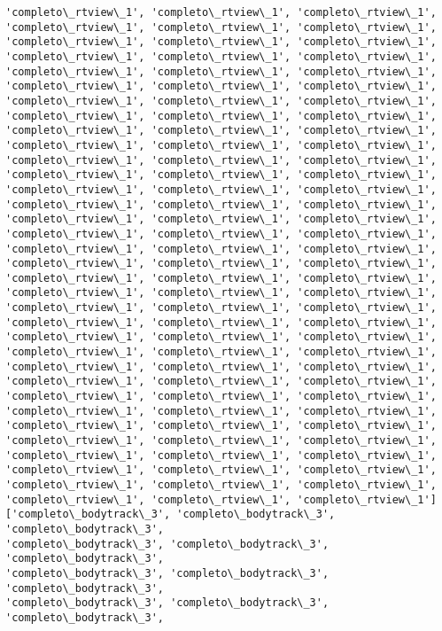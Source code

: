 \documentclass[11pt]{article}
\begin{document}
\begin{Verbatim}[commandchars=\\\{\}]
'completo\_rtview\_1', 'completo\_rtview\_1', 'completo\_rtview\_1',
'completo\_rtview\_1', 'completo\_rtview\_1', 'completo\_rtview\_1',
'completo\_rtview\_1', 'completo\_rtview\_1', 'completo\_rtview\_1',
'completo\_rtview\_1', 'completo\_rtview\_1', 'completo\_rtview\_1',
'completo\_rtview\_1', 'completo\_rtview\_1', 'completo\_rtview\_1',
'completo\_rtview\_1', 'completo\_rtview\_1', 'completo\_rtview\_1',
'completo\_rtview\_1', 'completo\_rtview\_1', 'completo\_rtview\_1',
'completo\_rtview\_1', 'completo\_rtview\_1', 'completo\_rtview\_1',
'completo\_rtview\_1', 'completo\_rtview\_1', 'completo\_rtview\_1',
'completo\_rtview\_1', 'completo\_rtview\_1', 'completo\_rtview\_1',
'completo\_rtview\_1', 'completo\_rtview\_1', 'completo\_rtview\_1',
'completo\_rtview\_1', 'completo\_rtview\_1', 'completo\_rtview\_1',
'completo\_rtview\_1', 'completo\_rtview\_1', 'completo\_rtview\_1',
'completo\_rtview\_1', 'completo\_rtview\_1', 'completo\_rtview\_1',
'completo\_rtview\_1', 'completo\_rtview\_1', 'completo\_rtview\_1',
'completo\_rtview\_1', 'completo\_rtview\_1', 'completo\_rtview\_1',
'completo\_rtview\_1', 'completo\_rtview\_1', 'completo\_rtview\_1',
'completo\_rtview\_1', 'completo\_rtview\_1', 'completo\_rtview\_1',
'completo\_rtview\_1', 'completo\_rtview\_1', 'completo\_rtview\_1',
'completo\_rtview\_1', 'completo\_rtview\_1', 'completo\_rtview\_1',
'completo\_rtview\_1', 'completo\_rtview\_1', 'completo\_rtview\_1',
'completo\_rtview\_1', 'completo\_rtview\_1', 'completo\_rtview\_1',
'completo\_rtview\_1', 'completo\_rtview\_1', 'completo\_rtview\_1',
'completo\_rtview\_1', 'completo\_rtview\_1', 'completo\_rtview\_1',
'completo\_rtview\_1', 'completo\_rtview\_1', 'completo\_rtview\_1',
'completo\_rtview\_1', 'completo\_rtview\_1', 'completo\_rtview\_1',
'completo\_rtview\_1', 'completo\_rtview\_1', 'completo\_rtview\_1',
'completo\_rtview\_1', 'completo\_rtview\_1', 'completo\_rtview\_1',
'completo\_rtview\_1', 'completo\_rtview\_1', 'completo\_rtview\_1',
'completo\_rtview\_1', 'completo\_rtview\_1', 'completo\_rtview\_1',
'completo\_rtview\_1', 'completo\_rtview\_1', 'completo\_rtview\_1',
'completo\_rtview\_1', 'completo\_rtview\_1', 'completo\_rtview\_1',
'completo\_rtview\_1', 'completo\_rtview\_1', 'completo\_rtview\_1',
'completo\_rtview\_1', 'completo\_rtview\_1', 'completo\_rtview\_1']
['completo\_bodytrack\_3', 'completo\_bodytrack\_3', 'completo\_bodytrack\_3',
'completo\_bodytrack\_3', 'completo\_bodytrack\_3', 'completo\_bodytrack\_3',
'completo\_bodytrack\_3', 'completo\_bodytrack\_3', 'completo\_bodytrack\_3',
'completo\_bodytrack\_3', 'completo\_bodytrack\_3', 'completo\_bodytrack\_3',

\end{Verbatim}
\end{document}
